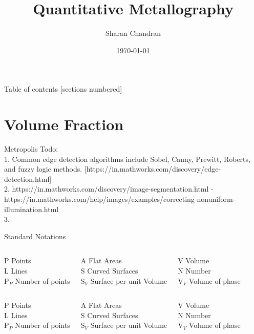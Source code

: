 \documentclass[10pt]{beamer}
\title{Quantitative Metallography}
\date{\today}
\author{Sharan Chandran}
\institute{Indian Institute of Science}
\begin{document}
\maketitle

\begin{frame}{Table of contents}
  [sections numbered]
  \tableofcontents[hideallsubsections]
\end{frame}

\section{Volume Fraction}

\begin{frame}[fragile]{Metropolis}
Todo: \\
1. Common edge detection algorithms include Sobel, Canny, Prewitt, Roberts, and fuzzy logic methods. [https://in.mathworks.com/discovery/edge-detection.html] \\
2. https://in.mathworks.com/discovery/image-segmentation.html - https://in.mathworks.com/help/images/examples/correcting-nonuniform-illumination.html \\
3. 
\end{frame}


\begin{frame}{Standard Notations}


  \begin{columns}[T,onlytextwidth]
    P Points \\
    L Lines  \\
    P$ _{P} $ Number of points
  
 
   A Flat Areas \\
   S Curved Surfaces \\
   S$ _{V} $ Surface per unit Volume
  
    V Volume \\
    N Number \\
    V$ _{V} $ Volume of phase
\end{columns}     

  \begin{columns}[T,onlytextwidth]
    P Points \\
    L Lines  \\
    P$ _{P} $ Number of points
  
 
   A Flat Areas \\
   S Curved Surfaces \\
   S$ _{V} $ Surface per unit Volume
  
    V Volume \\
    N Number \\
    V$ _{V} $ Volume of phase
\end{columns}

\end{frame}
\end{document}
